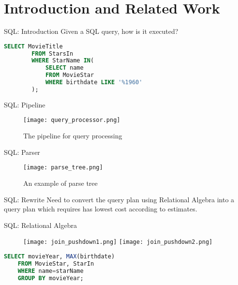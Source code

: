 \section{Introduction and Related Work}
\frame{\sectionpage}


\begin{frame}[fragile]{SQL: Introduction}
    Given a SQL query, how is it executed?
    \begin{lstlisting}[language=SQL, caption= SQL query to execute.]
        SELECT MovieTitle
        FROM StarsIn
        WHERE StarName IN(
            SELECT name
            FROM MovieStar
            WHERE birthdate LIKE '%1960'
        );
    \end{lstlisting}
\end{frame}

\begin{frame}{SQL: Pipeline}
    \begin{figure}
        \centering
        \texttt{[image: query\_processor.png]}\\
        \caption{The pipeline for query processing}
        \label{fig:query_processor}
    \end{figure}
\end{frame}

\begin{frame}{SQL: Parser}
    \begin{figure}
        \centering
        \texttt{[image: parse\_tree.png]}\\
        \caption{An example of parse tree}
        \label{fig:prase_tree}
    \end{figure}
\end{frame}

\begin{frame}{SQL: Rewrite}
    Need to convert the query plan using Relational Algebra into a query plan which requires has lowest cost according to estimates.
\end{frame}

\begin{frame}[fragile]{SQL: Relational Algebra}
    \begin{figure}
        \centering
        \texttt{[image: join\_pushdown1.png]}
        \texttt{[image: join\_pushdown2.png]}
        \label{fig:j_1}
    \end{figure}
    \begin{lstlisting}[language=SQL]
    SELECT movieYear, MAX(birthdate) 
    FROM MovieStar, StarIn
    WHERE name=starName 
    GROUP BY movieYear;
    \end{lstlisting}
\end{frame}

